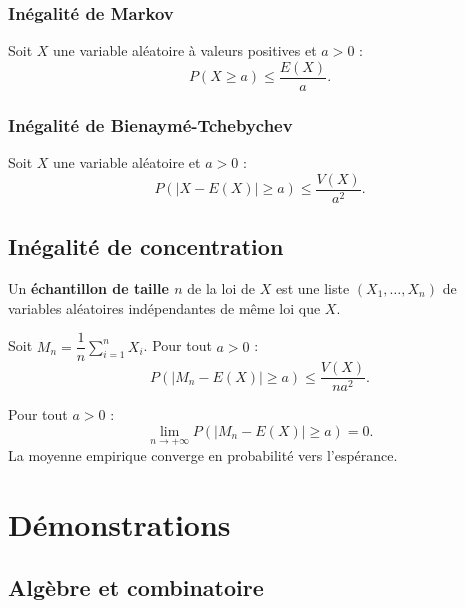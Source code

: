\documentclass[11pt,a4paper,openany]{book}
\theoremstyle{definition}
\newcommand{\nchap}{
    \setcounter{Définition}{0}
    \setcounter{Propriété}{0}
    \setcounter{Théorème}{0}
    \setcounter{Remarque}{0}
    \setcounter{Exemple}{0}
}
\begin{document}
    \subsection{Inégalité de Markov}
    \begin{Propriété}
        Soit $X$ une variable aléatoire à valeurs positives et $a>0$ :
        \[
            P(X\geq a)\leq\frac{E(X)}{a}.
        \]
    \end{Propriété}

    \subsection{Inégalité de Bienaymé-Tchebychev}
    \begin{Propriété}
        Soit $X$ une variable aléatoire et $a>0$ :
        \[
            P\!\left(|X-E(X)|\geq a\right)\leq\frac{V(X)}{a^2}.
        \]
    \end{Propriété}

    \section{Inégalité de concentration}
    \begin{Définition}
        Un \textbf{échantillon de taille $n$} de la loi de $X$ est une liste
        $(X_1,\ldots,X_n)$ de variables aléatoires indépendantes de même loi que $X$.
    \end{Définition}

    \begin{Théorème}
        Soit $M_n=\dfrac{1}{n}\sum_{i=1}^n X_i$. Pour tout $a>0$ :
        \[
            P\!\left(|M_n-E(X)|\geq a\right)\leq\frac{V(X)}{na^2}.
        \]
    \end{Théorème}

    \begin{Propriété}
        Pour tout $a>0$ :
        \[
            \lim_{n\to+\infty}P\!\left(|M_n-E(X)|\geq a\right)=0.
        \]
        La moyenne empirique converge en probabilité vers l'espérance.
    \end{Propriété}


    \appendix
    \chapter{Démonstrations}
    \nchap

    \section{Algèbre et combinatoire}
\end{document}
